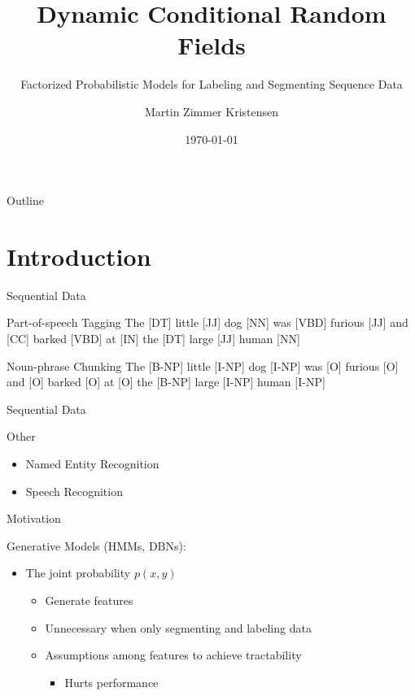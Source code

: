 \documentclass[presentation,bigger]{beamer}
\author{Martin Zimmer Kristensen}
\date{\today}
\title{Dynamic Conditional Random Fields}
\subtitle{Factorized Probabilistic Models for Labeling and Segmenting Sequence Data}
\begin{document}
\maketitle
\begin{frame}{Outline}
\setcounter{tocdepth}{1}
\tableofcontents
\end{frame}

\section{Introduction}
\label{sec:orgheadline9}
\begin{frame}[label={sec:orgheadline1}]{Sequential Data}
\begin{block}{Part-of-speech Tagging}
The \alert{[DT]} little \alert{[JJ]} dog \alert{[NN]} was \alert{[VBD]} furious \alert{[JJ]} and \alert{[CC]} barked \alert{[VBD]} at \alert{[IN]} the \alert{[DT]} large \alert{[JJ]} human \alert{[NN]}
\end{block}
\begin{block}{Noun-phrase Chunking}
The \alert{[B-NP]} little \alert{[I-NP]} dog \alert{[I-NP]} was \alert{[O]} furious \alert{[O]} and \alert{[O]} barked \alert{[O]} at \alert{[O]} the \alert{[B-NP]} large \alert{[I-NP]} human \alert{[I-NP]}
\end{block}
\end{frame}
\begin{frame}[label={sec:orgheadline2}]{Sequential Data}
\begin{block}{Other}
\begin{itemize}
\item Named Entity Recognition
\item Speech Recognition
\end{itemize}
\end{block}
\end{frame}
\begin{frame}[label={sec:orgheadline3}]{Motivation}
\begin{block}{Generative Models (HMMs, DBNs):}
\begin{itemize}
\item The joint probability \(p(x,y)\)
\begin{itemize}
\item Generate features
\item Unnecessary when only segmenting and labeling data
\item Assumptions among features to achieve tractability
\begin{itemize}
\item Hurts performance
\end{itemize}
\end{itemize}
\end{itemize}
\end{block}
\end{frame}
\end{document}
